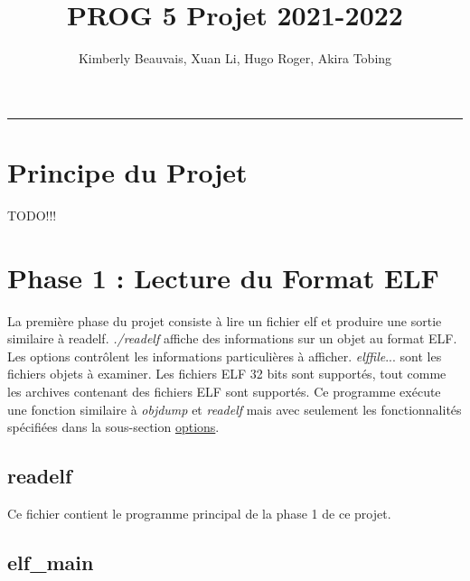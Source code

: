 \documentclass[a4paper]{article} %
\title{PROG 5 Projet 2021-2022}
\author{Kimberly Beauvais, Xuan Li, Hugo Roger, Akira Tobing}
\begin{document}
\maketitle
\begin{center}
\rule{\textwidth}{1pt}
\end{center}


\renewcommand{\contentsname}{Table des Matières}
\tableofcontents


\section*{Principe du Projet}

TODO!!!


\section{Phase 1 : Lecture du Format ELF }
\label{sec:phase1}
\noindent La première phase du projet consiste à lire un fichier elf et produire une sortie similaire à readelf. \textit{./readelf} affiche des informations sur un objet au format ELF.  Les options contrôlent les informations particulières à afficher. \textit{elffile}... sont les fichiers objets à examiner.  Les fichiers ELF 32 bits sont supportés, tout comme les archives contenant des fichiers ELF sont supportés. Ce programme exécute une fonction similaire à \textit{objdump} et \textit{readelf} mais avec seulement les fonctionnalités spécifiées dans la sous-section \hyperref[sec:options]{options}. 


\subsection{readelf}
\label{sec:readelf}
Ce fichier contient le programme principal de la phase 1 de ce projet. 


\subsection{elf\_main}
\end{document}
